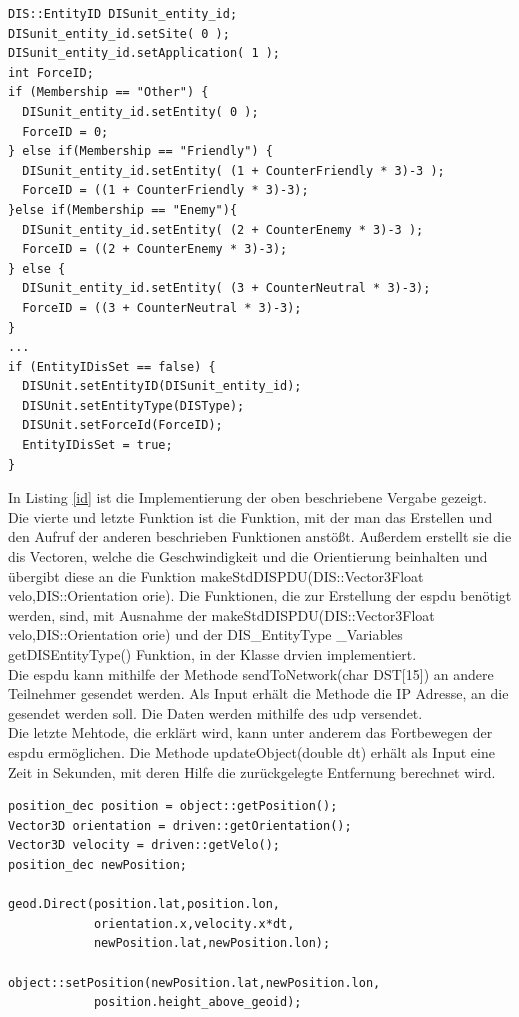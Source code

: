 \begin{lstlisting}[caption = EntityID und ForceID ,label= id]
DIS::EntityID DISunit_entity_id;
DISunit_entity_id.setSite( 0 );
DISunit_entity_id.setApplication( 1 );
int ForceID;
if (Membership == "Other") {
  DISunit_entity_id.setEntity( 0 );
  ForceID = 0;
} else if(Membership == "Friendly") {
  DISunit_entity_id.setEntity( (1 + CounterFriendly * 3)-3 );
  ForceID = ((1 + CounterFriendly * 3)-3);
}else if(Membership == "Enemy"){
  DISunit_entity_id.setEntity( (2 + CounterEnemy * 3)-3 );
  ForceID = ((2 + CounterEnemy * 3)-3);
} else {
  DISunit_entity_id.setEntity( (3 + CounterNeutral * 3)-3);
  ForceID = ((3 + CounterNeutral * 3)-3);
}
...
if (EntityIDisSet == false) {
  DISUnit.setEntityID(DISunit_entity_id);
  DISUnit.setEntityType(DISType);
  DISUnit.setForceId(ForceID);
  EntityIDisSet = true;
}
\end{lstlisting}
In Listing \ref{id} ist die Implementierung der oben beschriebene Vergabe gezeigt.
\\
Die vierte und letzte Funktion ist die Funktion, mit der man das Erstellen und den Aufruf der anderen beschrieben Funktionen anstößt. Außerdem erstellt sie die \ac{dis} Vectoren, welche die Geschwindigkeit und die Orientierung beinhalten und übergibt diese an die Funktion \glqq makeStdDISPDU(DIS::Vector3Float velo,DIS::Orientation orie)\grqq{}. 
Die Funktionen, die zur Erstellung der \ac{espdu} benötigt werden, sind, mit Ausnahme der \glqq makeStdDISPDU(DIS::Vector3Float velo,DIS::Orientation orie)\grqq{} und der \glqq DIS\_EntityType
\_Variables getDISEntityType()\grqq{} Funktion, in der Klasse \glqq drvien \grqq{} implementiert. \\
Die \ac{espdu} kann mithilfe der Methode \glqq sendToNetwork(char DST[15]) \grqq{} an andere Teilnehmer gesendet werden. Als Input erhält die Methode die IP Adresse, an die gesendet werden soll. Die Daten werden mithilfe des \ac{udp} versendet.\\
Die letzte Mehtode, die erklärt wird, kann unter anderem das Fortbewegen der \ac{espdu} ermöglichen. 
Die Methode \glqq updateObject(double dt) \grqq{} erhält als Input eine Zeit in Sekunden, mit deren Hilfe die zurückgelegte Entfernung berechnet wird. 
 \begin{lstlisting}[caption = Update Funktion ,label= update]
position_dec position = object::getPosition();
Vector3D orientation = driven::getOrientation();
Vector3D velocity = driven::getVelo();
position_dec newPosition;

geod.Direct(position.lat,position.lon,
            orientation.x,velocity.x*dt,
            newPosition.lat,newPosition.lon);

object::setPosition(newPosition.lat,newPosition.lon,
		    position.height_above_geoid);
 \end{lstlisting}
